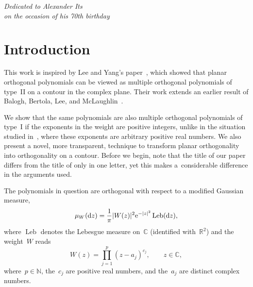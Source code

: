\documentclass[pdftex]{sigma}
\numberwithin{equation}{section}
\DeclareMathOperator{\Leb}{Leb}
\newcommand*{\Cset}{\mathbb{C}} %
\newcommand*{\Rset}{\mathbb{R}} %
\newcommand*{\Nset}{\mathbb{N}} %
\begin{document}


 \begin{flushright}
 \begin{minipage}{60mm}
 \textit{Dedicated to Alexander Its\\ on the occasion of his 70th birthday}
 \end{minipage}
 \end{flushright}

\renewcommand{\thefootnote}{\arabic{footnote}}
\setcounter{footnote}{0}

 \section{Introduction}
 This work is inspired by Lee and Yang's paper~\cite{LY2}, which showed that planar orthogonal polynomials can be viewed as multiple orthogonal polynomials of type~II on a contour in the complex plane. Their work extends an earlier result of Balogh, Bertola, Lee, and McLaughlin~\cite{BBLM}.

 We show that the same polynomials are also multiple orthogonal polynomials of type~I if the exponents in the weight are positive integers, unlike in the situation studied in~\cite{LY2}, where these exponents are arbitrary positive real numbers. We also present a novel, more transparent, technique to transform planar orthogonality into orthogonality on a contour. Before we begin, note that the title of our paper differs from the title of \cite{LY2} only in one letter, yet this makes a~considerable difference in the arguments used.

 The polynomials in question are orthogonal with respect to a modified Gaussian measure,
 \begin{gather}
 \label{eq:muW}
 \mu_W({\rm d}z) = \frac{1}{\pi} |W(z)|^2 {\rm e}^{-|z|^2} \Leb({\rm d}z),
 \end{gather}
 where $\Leb$ denotes the Lebesgue measure on~$\Cset$ (identified with~$\Rset^2$) and the weight~$W$ reads{\samepage
 \begin{equation}
 \label{eq:Wdef}
 W(z) = \prod_{j=1}^p (z-a_j)^{c_j}, \qquad z \in \Cset,
 \end{equation}
 where~$p \in \Nset$, the~$c_j$ are positive real numbers, and the~$a_j$ are distinct complex numbers.}
\end{document}
